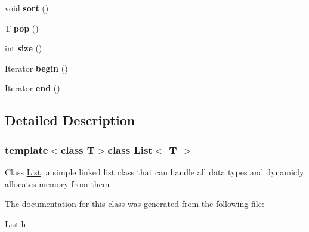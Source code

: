 \begin{DoxyCompactItemize}
\item 
\hypertarget{class_list_adcdf869b2506e2332052eff47afc8412}{void {\bfseries sort} ()}\label{class_list_adcdf869b2506e2332052eff47afc8412}

\item 
\hypertarget{class_list_ad19661456bd18843dfe970b5309e7516}{T {\bfseries pop} ()}\label{class_list_ad19661456bd18843dfe970b5309e7516}

\item 
\hypertarget{class_list_a2497bdf42246d61237aaf046c116183a}{int {\bfseries size} ()}\label{class_list_a2497bdf42246d61237aaf046c116183a}

\item 
\hypertarget{class_list_a3cd86b8318ab6be017fd69a71f1e4874}{Iterator {\bfseries begin} ()}\label{class_list_a3cd86b8318ab6be017fd69a71f1e4874}

\item 
\hypertarget{class_list_ad860fbbcfb2d693ab4f27fd0aa6125ad}{Iterator {\bfseries end} ()}\label{class_list_ad860fbbcfb2d693ab4f27fd0aa6125ad}

\end{DoxyCompactItemize}


\subsection{Detailed Description}
\subsubsection*{template$<$class T$>$class List$<$ T $>$}

Class \hyperlink{class_list}{List}, a simple linked list class that can handle all data types and dynamicly allocates memory from them 

The documentation for this class was generated from the following file\-:\begin{DoxyCompactItemize}
\item 
List.\-h\end{DoxyCompactItemize}
